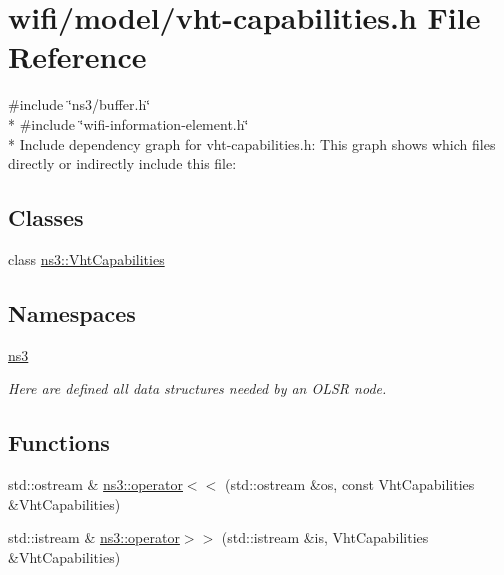 \hypertarget{vht-capabilities_8h}{}\section{wifi/model/vht-\/capabilities.h File Reference}
\label{vht-capabilities_8h}
{\ttfamily \#include \char`\"{}ns3/buffer.\+h\char`\"{}}\\*
{\ttfamily \#include \char`\"{}wifi-\/information-\/element.\+h\char`\"{}}\\*
Include dependency graph for vht-\/capabilities.h\+:
This graph shows which files directly or indirectly include this file\+:
\subsection*{Classes}
\begin{DoxyCompactItemize}
\item 
class \hyperlink{classns3_1_1VhtCapabilities}{ns3\+::\+Vht\+Capabilities}
\end{DoxyCompactItemize}
\subsection*{Namespaces}
\begin{DoxyCompactItemize}
\item 
 \hyperlink{namespacens3}{ns3}
\begin{DoxyCompactList}\small\item\em Here are defined all data structures needed by an O\+L\+SR node. \end{DoxyCompactList}\end{DoxyCompactItemize}
\subsection*{Functions}
\begin{DoxyCompactItemize}
\item 
std\+::ostream \& \hyperlink{namespacens3_a4b05f8ae914ef1326f2330a8426a498c}{ns3\+::operator$<$$<$} (std\+::ostream \&os, const Vht\+Capabilities \&Vht\+Capabilities)
\item 
std\+::istream \& \hyperlink{namespacens3_a6e4616316048a7f526bdd79ba0f8ba67}{ns3\+::operator$>$$>$} (std\+::istream \&is, Vht\+Capabilities \&Vht\+Capabilities)
\end{DoxyCompactItemize}
